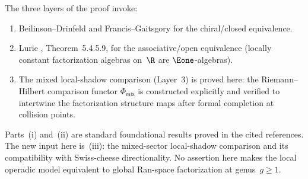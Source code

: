 \begin{remark}
\label{rem:bdcg-proof-inputs}
The three layers of the proof invoke:
\begin{enumerate}[label=\textup{(\roman*)}]
\item Beilinson--Drinfeld \cite{BD04} and Francis--Gaitsgory \cite{FG12} for the chiral/closed equivalence.
\item Lurie \cite{HA}, Theorem~5.4.5.9, for the associative/open equivalence (locally constant factorization algebras on~$\R$ are $\Eone$-algebras).
\item The mixed local-shadow comparison (Layer~3) is proved here:
the Riemann--Hilbert comparison functor $\Phi_{\mathsf{mix}}$ is
constructed explicitly and verified to intertwine the factorization
structure maps after formal completion at collision points.
\end{enumerate}
Parts~(i) and~(ii) are standard foundational results proved in the
cited references. The new input here is~(iii): the mixed-sector
local-shadow comparison and its compatibility
with Swiss-cheese directionality. No assertion here makes the local
operadic model equivalent to global Ran-space factorization at
genus~$g\ge 1$.
\end{remark}


